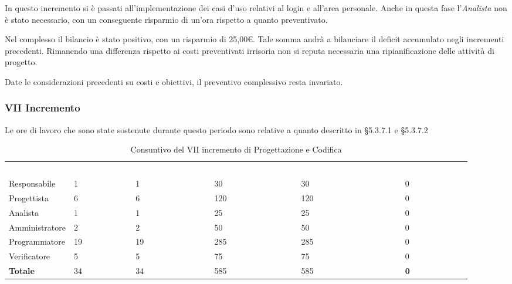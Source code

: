 In questo incremento si è passati all'implementazione dei casi d'uso relativi al login e all'area personale. Anche in questa fase l'\textit{Analista} non è stato necessario, con un conseguente risparmio di un'ora rispetto a quanto preventivato. 

Nel complesso il bilancio è stato positivo, con un risparmio di 25,00\euro. Tale somma andrà a bilanciare il deficit accumulato negli incrementi precedenti. Rimanendo una differenza rispetto ai costi preventivati irrisoria non si reputa necessaria una ripianificazione delle attività di progetto.

Date le considerazioni precedenti su costi e obiettivi, il preventivo complessivo resta invariato.


\pagebreak


\subsubsection{VII Incremento}
Le ore di lavoro che sono state sostenute durante questo periodo sono relative a quanto descritto in §5.3.7.1 e §5.3.7.2

\begin{table}[H]
\begin{center}
\renewcommand{\arraystretch}{1.5}
\begin{tabular}{ m{}<{\centering}  m{}<{\centering} m{}<{\centering} m{}<{\centering} m{}<{\centering} m{}<{\centering}}
	\rowcolor{darkblue}
	\textcolor{white}{\textbf{Ruolo}} & \textcolor{white}{\textbf{Ore Effettive}} & \textcolor{white}{\textbf{Ore Preventivate}}&\textcolor{white}{\textbf{Costo Effettivo (\euro)}}&\textcolor{white}{\textbf{Costo Preventivato (\euro)}}&\textcolor{white}{\textbf{Differenza (\euro)}}\\ 

	Responsabile  & 1 & 1 & 30 & 30 & 0\\	
	
	Progettista & 6 & 6 & 120 & 120 & 0\\
	
	Analista & 1 & 1 & 25 & 25 & 0\\
	
	Amministratore & 2 & 2 & 50 & 50 & 0\\
	
	Programmatore & 19 & 19 & 285 & 285 & 0\\
	
	Verificatore & 5 & 5 & 75 & 75 & 0\\
	
	\textbf{Totale} & 34 & 34 & 585 & 585 & \textbf{0} \\
	
\end{tabular}
\caption{Consuntivo del VII incremento di Progettazione e Codifica}
\end{center}
\end{table}


